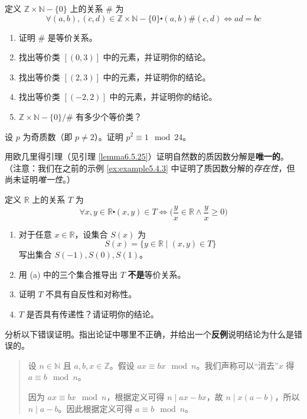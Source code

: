 \begin{exercise}
    定义 $\mathbb{Z} \times \mathbb{N} - \{0\}$ 上的关系 $\#$ 为
    \[\forall (a, b),(c, d) \in \mathbb{Z} \times \mathbb{N} - \{0\} \centerdot (a, b) \# (c, d) \iff ad = bc\]
    \begin{enumerate}[label=(\alph*)]
        \item 证明 $\#$ 是等价关系。
        \item 找出等价类 $[(0, 3)]$ 中的元素，并证明你的结论。
        \item 找出等价类 $[(2, 3)]$ 中的元素，并证明你的结论。
        \item 找出等价类 $[(-2, 2)]$ 中的元素，并证明你的结论。
        \item $\mathbb{Z} \times \mathbb{N} - \{0\} / \#$ 有多少个等价类？
    \end{enumerate}
\end{exercise}

\begin{exercise}
    设 $p$ 为奇质数（即 $p \ne 2$）。证明 $p^2 \equiv 1 \mod 24$。
\end{exercise}

\begin{exercise}
    用欧几里得引理（见引理 \ref{lemma6.5.25}）证明自然数的质因数分解是\textbf{唯一的}。\\
    （注意：我们在之前的示例 \ref{ex:example5.4.3} 中证明了质因数分解的\emph{存在性}，但尚未证明\emph{唯一性}。）
\end{exercise}

\begin{exercise}
    定义 $\mathbb{R}$ 上的关系 $T$ 为
    \[\forall x, y \in \mathbb{R} \centerdot (x, y) \in T \iff \Big(\frac{y}{x} \in \mathbb{R} \land \frac{y}{x} \ge 0 \Big)\]
    \begin{enumerate}[label=(\alph*)]
        \item 对于任意 $x \in \mathbb{R}$，设集合 $S(x)$ 为
            \[S(x) = \{y \in \mathbb{R} \mid (x, y) \in T\}\]
            写出集合 $S(-1), S(0), S(1)$。
        \item 用 (a) 中的三个集合推导出 $T$ \textbf{不是}等价关系。
        \item 证明 $T$ 不具有自反性和对称性。
        \item $T$ 是否具有传递性？请证明你的结论。
    \end{enumerate}
\end{exercise}

\begin{exercise}
    分析以下错误证明。指出论证中哪里不正确，并给出一个\textbf{反例}说明结论为什么是错误的。
    \begin{quote}
        设 $n \in \mathbb{N}$ 且 $a,b,x \in \mathbb{Z}$。假设 $ax \equiv bx \mod n$。我们声称可以``消去''$x$ 得 $a \equiv b \mod n$。

        因为 $ax \equiv bx \mod n$，根据定义可得 $n \mid ax-bx$，故 $n \mid x(a-b)$，所以 $n \mid a-b$。因此根据定义可得 $a \equiv b \mod n$。
    \end{quote}
\end{exercise}


